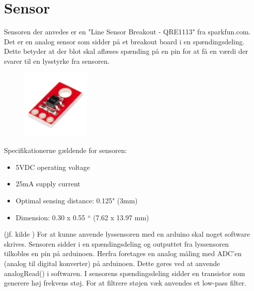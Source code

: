 \section{Sensor}
Sensoren der anvedes er en "Line Sensor Breakout - QRE1113" fra sparkfun.com\cite{sparkfun_link}. Det er en analog sensor som sidder på et breakout board i en spændingsdeling. Dette betyder at der blot skal aflæses spænding på en pin for at få en værdi der svarer til en lysstyrke fra sensoren.

\begin{figure}[h!]
  \centering
  \includegraphics[width=0.3\textwidth]{figures/lyssensor.png}
\end{figure}

Specifikationerne gældende for sensoren: 
\begin{itemize}  
\item 5VDC operating voltage 
\item 25mA supply current
\item Optimal sensing distance: 0.125" (3mm) 
\item Dimension: 0.30 x 0.55 “ (7.62 x 13.97 mm)
\end{itemize}

(jf. kilde \cite{sparkfun_link_sensor})
\newline
For at kunne anvende lyssensoren med en arduino skal noget software skrives. Sensoren sidder i en spændingsdeling og outputtet fra lyssensoren tilkobles en pin på arduinoen.
Herfra foretages en analog måling med ADC'en (analog til digital konverter) på arduinoen. Dette gøres ved at anvende analogRead() i softwaren.
\newline
I sensorens spændingsdeling sidder en transistor som generere høj frekvens støj. For at filtrere støjen væk anvendes et low-pass filter.
\newline
